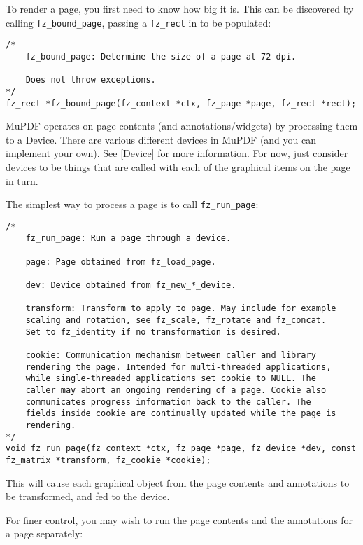 \documentclass[oneside]{book}
\newcommand{\rjwref}[1] {\autoref{#1} \nameref{#1}}
\begin{document}
To render a page, you first need to know how big it is. This can be discovered by calling \texttt{fz\_bound\_page}, passing a \texttt{fz\_rect} in to be populated:

\begin{lstlisting}
/*
	fz_bound_page: Determine the size of a page at 72 dpi.

	Does not throw exceptions.
*/
fz_rect *fz_bound_page(fz_context *ctx, fz_page *page, fz_rect *rect);
\end{lstlisting}

MuPDF operates on page contents (and annotations/widgets) by processing them to a Device. There are various different devices in MuPDF (and you can implement your own). See \rjwref{Device} for more information. For now, just consider devices to be things that are called with each of the graphical items on the page in turn.

The simplest way to process a page is to call \texttt{fz\_run\_page}:

\begin{lstlisting}
/*
	fz_run_page: Run a page through a device.

	page: Page obtained from fz_load_page.

	dev: Device obtained from fz_new_*_device.

	transform: Transform to apply to page. May include for example
	scaling and rotation, see fz_scale, fz_rotate and fz_concat.
	Set to fz_identity if no transformation is desired.

	cookie: Communication mechanism between caller and library
	rendering the page. Intended for multi-threaded applications,
	while single-threaded applications set cookie to NULL. The
	caller may abort an ongoing rendering of a page. Cookie also
	communicates progress information back to the caller. The
	fields inside cookie are continually updated while the page is
	rendering.
*/
void fz_run_page(fz_context *ctx, fz_page *page, fz_device *dev, const fz_matrix *transform, fz_cookie *cookie);
\end{lstlisting}

This will cause each graphical object from the page contents and annotations to be transformed, and fed to the device.

For finer control, you may wish to run the page contents and the annotations for a page separately:
\end{document}
